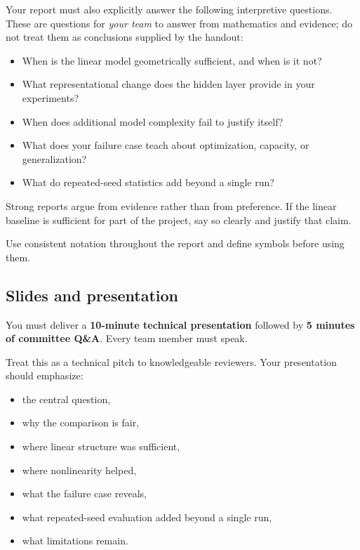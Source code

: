 \documentclass[11pt]{article}
\begin{document}
Your report must also explicitly answer the following interpretive questions. These are questions for \emph{your team} to answer from mathematics and evidence; do not treat them as conclusions supplied by the handout:

\begin{itemize}
    \item When is the linear model geometrically sufficient, and when is it not?
    \item What representational change does the hidden layer provide in your experiments?
    \item When does additional model complexity fail to justify itself?
    \item What does your failure case teach about optimization, capacity, or generalization?
    \item What do repeated-seed statistics add beyond a single run?
\end{itemize}

Strong reports argue from evidence rather than from preference. If the linear baseline is sufficient for part of the project, say so clearly and justify that claim.

Use consistent notation throughout the report and define symbols before using them.

\subsection{Slides and presentation}

You must deliver a \textbf{10-minute technical presentation} followed by \textbf{5 minutes of committee Q\&A}. Every team member must speak.

Treat this as a technical pitch to knowledgeable reviewers. Your presentation should emphasize:

\begin{itemize}
    \item the central question,
    \item why the comparison is fair,
    \item where linear structure was sufficient,
    \item where nonlinearity helped,
    \item what the failure case reveals,
    \item what repeated-seed evaluation added beyond a single run,
    \item what limitations remain.
\end{itemize}
\end{document}
